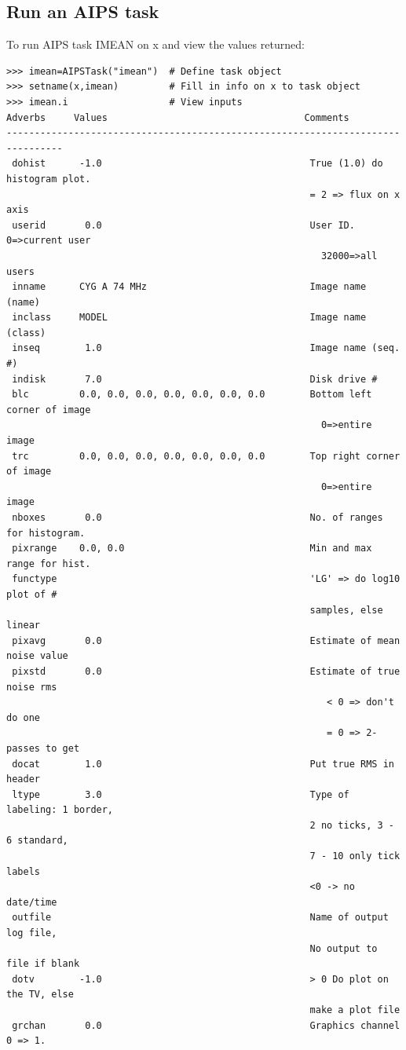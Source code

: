 \documentclass[11pt]{report}
\begin{document}
\subsection{Run an AIPS task}
To run AIPS task IMEAN on x and view the values returned:
\begin{verbatim}
>>> imean=AIPSTask("imean")  # Define task object
>>> setname(x,imean)         # Fill in info on x to task object
>>> imean.i                  # View inputs
Adverbs     Values                                   Comments
--------------------------------------------------------------------------------
 dohist      -1.0                                     True (1.0) do histogram plot.
                                                      = 2 => flux on x axis
 userid       0.0                                     User ID.  0=>current user
                                                        32000=>all users
 inname      CYG A 74 MHz                             Image name (name)
 inclass     MODEL                                    Image name (class)
 inseq        1.0                                     Image name (seq. #)
 indisk       7.0                                     Disk drive #
 blc         0.0, 0.0, 0.0, 0.0, 0.0, 0.0, 0.0        Bottom left corner of image
                                                        0=>entire image
 trc         0.0, 0.0, 0.0, 0.0, 0.0, 0.0, 0.0        Top right corner of image
                                                        0=>entire image
 nboxes       0.0                                     No. of ranges for histogram.
 pixrange    0.0, 0.0                                 Min and max range for hist.
 functype                                             'LG' => do log10 plot of #
                                                      samples, else linear
 pixavg       0.0                                     Estimate of mean noise value
 pixstd       0.0                                     Estimate of true noise rms
                                                         < 0 => don't do one
                                                         = 0 => 2-passes to get
 docat        1.0                                     Put true RMS in header
 ltype        3.0                                     Type of labeling: 1 border,
                                                      2 no ticks, 3 - 6 standard,
                                                      7 - 10 only tick labels
                                                      <0 -> no date/time
 outfile                                              Name of output log file,
                                                      No output to file if blank
 dotv        -1.0                                     > 0 Do plot on the TV, else
                                                      make a plot file
 grchan       0.0                                     Graphics channel 0 => 1.


\end{verbatim}
\end{document}
